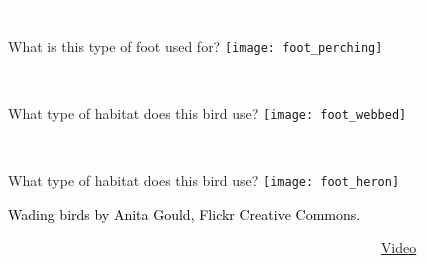 \documentclass[t]{beamer}
\begin{document}
{
\begin{frame}[b,plain]
	\tiny\hspace{8em}\textcolor{white}{Yellow-rumped Warbler by Jack Sutton, Flickr Creative Commons.}
\end{frame}
}

{
\begin{frame}[c,plain]{What is this type of foot used for?}
	\centering
	\texttt{[image: foot\_perching]}\par
\end{frame}
}

{
\begin{frame}[b,plain]
	\hfill\tiny\textcolor{white}{Bananaquits by Leon-bojarzcuk, Wikimedia Commons.}
\end{frame}
}

{
\begin{frame}[c,plain]{What type of habitat does this bird use?}
	\centering
	\texttt{[image: foot\_webbed]}\par
\end{frame}
}

{
\begin{frame}[b,plain]
	\tiny\textcolor{white}{Ring-necked Duck by Rick Leche, Flickr Creative Commons.}
\end{frame}
}

{
\begin{frame}[c,plain]{What type of habitat does this bird use?}
	\centering
	\texttt{[image: foot\_heron]}\par
\end{frame}
}

{
\begin{frame}[b,plain]
	\tiny\textcolor{black}{Wading birds by Anita Gould, Flickr Creative Commons.}
\end{frame}
}

{
\begin{frame}[b,plain]
	\tiny\textcolor{white}{African Jacana by Arno Meintjes, Flickr Creative Commons.\hfill\href{http://www.youtube.com/watch?v=yVMOZhpVK2g}{Video}}
\end{frame}
}
\end{document}
